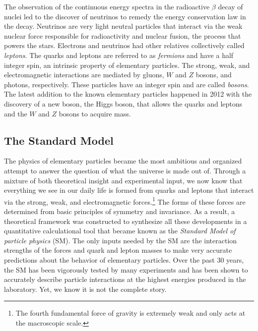 The observation of the continuous energy spectra in the radioactive $\beta$ decay of nuclei 
led to the discover of neutrinos to remedy  the energy conservation law in the decay. 
Neutrinos are very light neutral particles that interact via the weak nuclear force 
responsible for radioactivity and nuclear fusion, the process that powers the stars.
Electrons and neutrinos had other relatives collectively called \textit{leptons}.
The quarks and leptons are referred to as \textit{fermions} and
have a half integer spin, an intrinsic property of elementary particles.
The strong, weak, and electromagnetic interactions are mediated by 
gluons, $W$ and $Z$ bosons, and photons, respectively. These particles 
have an integer spin and are called \textit{bosons}. 
%
The latest addition to the known elementary particles happened in 2012 
 with the discovery of 
a new boson, the Higgs boson, 
that allows the quarks and leptons and the $W$ and $Z$ bosons to 
acquire mass\cite{Aad:2012tfa,Chatrchyan:2012xdj}.

\subsection*{The Standard Model}
The physics of elementary particles became the most ambitious and organized attempt to answer the question of what the universe is 
made out of. 
Through a mixture of both theoretical insight and experimental input, we now 
know that everything we see in our daily life is formed from quarks and leptons
that interact via the strong, weak, and electromagnetic forces.\footnote{ 
The fourth fundamental force of gravity is extremely weak and
only acts at the macroscopic scale.}
The forms of these forces are determined from basic principles of 
symmetry and invariance.
As a result, a theoretical framework was constructed to synthesize all these 
developments in a quantitative 
calculational tool that became known as the \textit{Standard Model of particle physics} (SM). 
The only inputs needed by the SM are the interaction strengths of the forces and quark and lepton masses to make 
very accurate predictions about the behavior of elementary particles.
Over the past 30 years, the SM has been vigorously tested by many 
experiments and has been shown to accurately describe particle 
interactions at the highest energies produced in the laboratory.
 Yet, we know it is not the complete story. 

